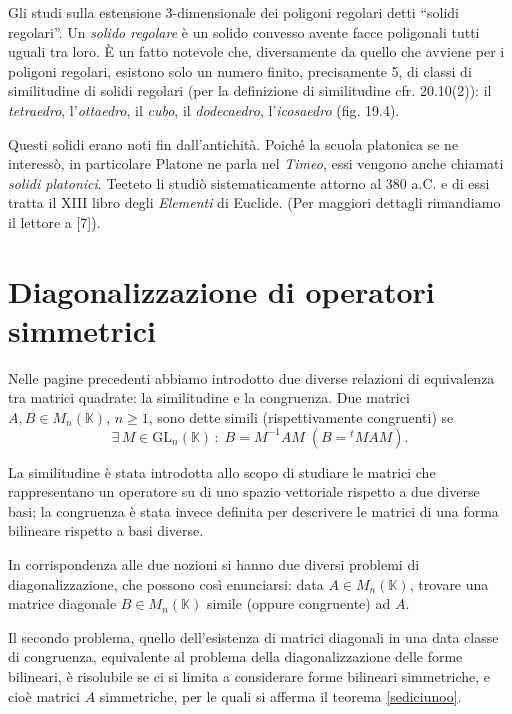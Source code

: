 \documentclass{article}
\theoremstyle{plain}
\theoremstyle{definition}
\theoremstyle{remark}
\begin{document}
Gli studi sulla estensione 3-dimensionale dei poligoni regolari detti ``solidi regolari''. Un 
\textit{solido regolare} è un solido convesso avente facce poligonali tutti uguali tra loro. È un fatto 
notevole che, diversamente da quello che avviene per i poligoni regolari, esistono solo un numero finito, 
precisamente 5, di classi di similitudine di solidi regolari (per la definizione di similitudine cfr. 
20.10(2)): il \textit{tetraedro}, l'\textit{ottaedro}, il \textit{cubo}, il \textit{dodecaedro}, 
l'\textit{icosaedro} (fig. 19.4).

Questi solidi erano noti fin dall'antichità. Poiché la scuola platonica se ne interessò, in particolare 
Platone ne parla nel \textit{Timeo}, essi vengono anche chiamati \textit{solidi platonici}. Teeteto li 
studiò sistematicamente attorno al 380 a.C. e di essi tratta il XIII libro degli \textit{Elementi} di 
Euclide. (Per maggiori dettagli rimandiamo il lettore a [7]).

\vspace{50pt}
\section{Diagonalizzazione di operatori simmetrici}
\vspace{20pt}

Nelle pagine precedenti abbiamo introdotto due diverse relazioni di equivalenza tra matrici quadrate: 
la similitudine e la congruenza. Due matrici $A,B \in M_n(\mathbb{K})$, $n \geq 1$, sono dette simili
(rispettivamente congruenti) se 
\[\exists\,M \in \mathrm{GL}_n(\mathbb{K})\,:\;B = M^{-1}AM \;(B = {}^tMAM).\]

\vspace{10pt}

La similitudine è stata introdotta allo scopo di studiare le matrici che rappresentano un operatore su di 
uno spazio vettoriale rispetto a due diverse basi; la congruenza è stata invece definita per descrivere le 
matrici di una forma bilineare rispetto a basi diverse.

\vspace{10pt}

In corrispondenza alle due nozioni si hanno due diversi problemi di diagonalizzazione, che possono così 
enunciarsi: data $A \in M_n(\mathbb{K})$, trovare una matrice diagonale $B \in M_n(\mathbb{K})$ simile 
(oppure congruente) ad $A$.

\vspace{10pt}

Il secondo problema, quello dell'esistenza di matrici diagonali in una data classe di congruenza, 
equivalente al problema della diagonalizzazione delle forme bilineari, è risolubile se ci si limita a 
considerare forme bilineari simmetriche, e cioè matrici $A$ simmetriche, per le quali si afferma il 
teorema \ref{sediciunoo}.
\end{document}
